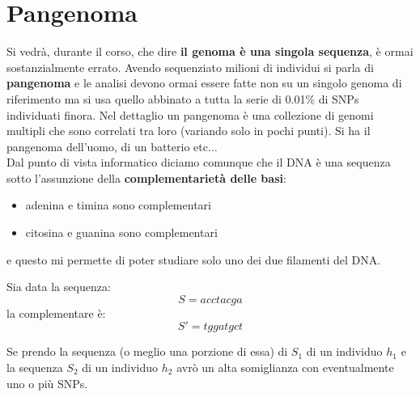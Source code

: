\documentclass[a4paper,12pt, oneside]{book}
\begin{document}
\section{Pangenoma}
Si vedrà, durante il corso, che dire \textbf{il genoma è una singola sequenza},
è ormai sostanzialmente errato. Avendo sequenziato milioni di individui si parla
di \textbf{pangenoma} e le analisi devono ormai essere fatte non su un singolo
genoma di riferimento ma si usa quello abbinato a tutta la serie di 0.01\% di
SNPs individuati finora.
Nel dettaglio un pangenoma è una collezione di genomi multipli che sono
correlati tra loro (variando solo in pochi punti). Si ha il pangenoma dell'uomo,
di un batterio etc$\ldots$\\
Dal punto di vista informatico diciamo comunque che il DNA è una sequenza sotto
l'assunzione della \textbf{complementarietà delle basi}:
\begin{itemize}
  \item adenina e timina sono complementari
  \item citosina e guanina sono complementari 
\end{itemize}
e questo mi permette di poter studiare solo uno dei due filamenti del DNA.
\begin{esempio}
  Sia data la sequenza:
  \[S=acctacga\]
  la complementare è:
  \[S'=tggatgct\]
\end{esempio}
Se prendo la sequenza (o meglio una porzione di essa) di $S_1$ di un individuo
$h_1$ e la sequenza $S_2$ di un individuo $h_2$ avrò un alta somiglianza con
eventualmente uno o più SNPs.
\end{document}
